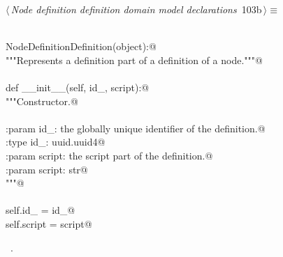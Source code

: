 \documentclass[
    a4paper,      %
    10pt,         %
    openright,    %
    notitlepage,  %
    parskip=half, %
]{scrreprt}       %
\theoremstyle{definition}                    %
\begin{document}
\begin{flushleft} \small
\begin{minipage}{\linewidth}\label{scrap168}\raggedright\small
{} $\langle\,${\itshape Node definition definition domain model declarations}\nobreak\ {\footnotesize {103b}}$\,\rangle\equiv$
\vspace{-1exm}
\begin{list}{}{} \item
\mbox{}\lstinline@@\\
\mbox{}\lstinline@class NodeDefinitionDefinition(object):@\\
\mbox{}\lstinline@    """Represents a definition part of a definition of a node."""@\\
\mbox{}\lstinline@@\\
\mbox{}\lstinline@    def __init__(self, id_, script):@\\
\mbox{}\lstinline@        """Constructor.@\\
\mbox{}\lstinline@@\\
\mbox{}\lstinline@        :param id_: the globally unique identifier of the definition.@\\
\mbox{}\lstinline@        :type  id_: uuid.uuid4@\\
\mbox{}\lstinline@        :param script: the script part of the definition.@\\
\mbox{}\lstinline@        :param script: str@\\
\mbox{}\lstinline@        """@\\
\mbox{}\lstinline@@\\
\mbox{}\lstinline@        self.id_ = id_@\\
\mbox{}\lstinline@        self.script = script@{\NWsep}
\end{list}
\vspace{-1.5ex}
\footnotesize
\begin{list}{}{\setlength{\itemsep}{-\parsep}\setlength{\itemindent}{-\leftmargin}}
\item \NWtxtMacroRefIn\ .

\item{}
\end{list}
\end{minipage}\vspace{4ex}
\end{flushleft}
\end{document}
